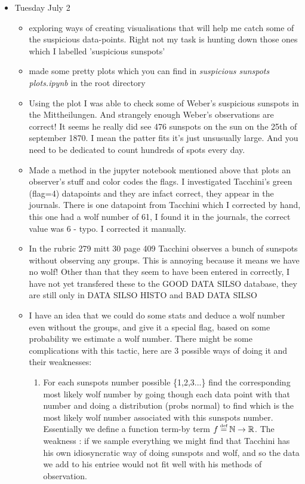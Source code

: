 \documentclass[12pt]{article}
\newcommand{\N}{\mathbb{N}}
\newcommand{\R}{\mathbb{R}}
\newcommand\defeq{\mathrel{\stackrel{\makebox[0pt]{\mbox{\normalfont\tiny def}}}{=}}}
\begin{document}
\begin{itemize}
    \item Tuesday July 2
    \begin{itemize}
        \item exploring ways of creating visualisations that will help me catch some of the suspicious data-points. Right not my task is hunting down those ones which I labelled 'suspicious sunspots'
        \item made some pretty plots which you can find in \textit{suspicious sunspots plots.ipynb} in the root directory
        \item Using the plot I was able to check some of Weber's suspicious sunspots in the Mittheilungen. And strangely enough Weber's observations are correct! It seems he really did see 476 sunspots on the sun on the 25th of september 1870. I mean the patter fits it's just unsusually large. And you need to be dedicated to count hundreds of spots every day.
        \item Made a method in the jupyter notebook mentioned above that plots an observer's stuff and color codes the flags. I investigated Tacchini's green (flag=4) datapoints and they are infact correct, they appear in the journals. There is one datapoint from Tacchini which I corrected by hand, this one had a wolf number of 61, I found it in the journals, the correct value was 6 - typo. I corrected it manually.
        \item In the rubric 279 mitt 30 page 409 Tacchini observes a bunch of sunspots without observing any groups. This is annoying because it means we have no wolf! Other than that they seem to have been entered in correctly, I have not yet transfered these to the GOOD DATA SILSO database, they are still only in DATA SILSO HISTO and BAD DATA SILSO
        \item I have an idea that we could do some stats and deduce a wolf number even without the groups, and give it a special flag, based on some probability we estimate a wolf number. There might be some complications with this tactic, here are 3 possible ways of doing it and their weaknesses:
        \begin{enumerate}
            \item For each sunspots number possible \{1,2,3...\} find the corresponding most likely wolf number by going though each data point with that number and doing a distribution (probs normal) to find which is the most likely wolf number associated with this sunspots number. Essentially we define a function term-by term $f \defeq{} \N \to \R$. The weakness : if we sample everything we might find that Tacchini has his own idiosyncratic way of doing sunspots and wolf, and so the data we add to his entriee would not fit well with his methods of observation.

\end{enumerate}
\end{itemize}
\end{itemize}
\end{document}
